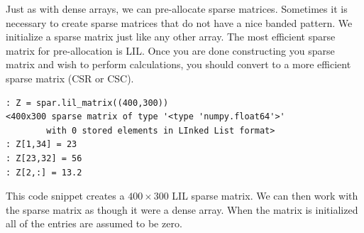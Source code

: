 Just as with dense arrays, we can pre-allocate sparse matrices.
Sometimes it is necessary to create sparse matrices that do not have a nice banded pattern. 
We initialize a sparse matrix just like any other array.  
The most efficient sparse matrix for pre-allocation is LIL.  
Once you are done constructing you sparse matrix and wish to perform calculations, 
you should convert to a more efficient sparse matrix (CSR or CSC).
\begin{lstlisting}
: Z = spar.lil_matrix((400,300))
<400x300 sparse matrix of type '<type 'numpy.float64'>'
        with 0 stored elements in LInked List format>
: Z[1,34] = 23
: Z[23,32] = 56
: Z[2,:] = 13.2
\end{lstlisting}
This code snippet creates a $400 \times 300$ LIL sparse matrix. 
We can then work with the sparse matrix as though it were a dense array. 
When the matrix is initialized all of the entries are assumed to be zero.